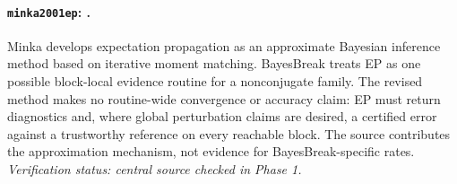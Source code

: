 
\paragraph{\texttt{minka2001ep}: \citet{minka2001ep}.}
Minka develops expectation propagation as an approximate Bayesian inference method based on iterative moment matching. BayesBreak treats EP as one possible block-local evidence routine for a nonconjugate family. The revised method makes no routine-wide convergence or accuracy claim: EP must return diagnostics and, where global perturbation claims are desired, a certified error against a trustworthy reference on every reachable block. The source contributes the approximation mechanism, not evidence for BayesBreak-specific rates. \textit{Verification status: central source checked in Phase 1.}
